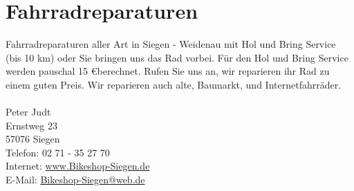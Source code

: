 \section{Fahrradreparaturen}
Fahrradreparaturen aller Art in Siegen - Weidenau mit Hol und Bring Service (bis 10 km) oder Sie bringen uns das Rad vorbei. Für den Hol und Bring Service werden pauschal 15 \euro berechnet. Rufen Sie uns an, wir reparieren ihr Rad zu einem guten Preis. Wir reparieren auch alte, Baumarkt, und Internetfahrräder. \\
\\
Peter Judt \\
Ernstweg 23 \\
57076 Siegen \\
Telefon: 02 71 - 35 27 70 \\ 
Internet: \href{www.Bikeshop-Siegen.de}{www.Bikeshop-Siegen.de}\\
E-Mail: \href{mailto:Bikeshop-Siegen@web.de}{Bikeshop-Siegen@web.de}